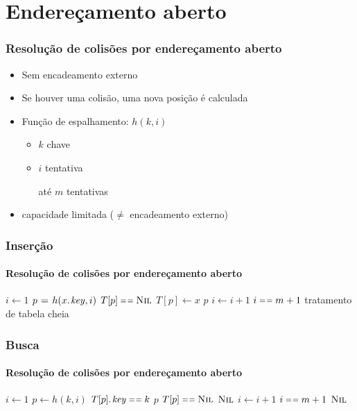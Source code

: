 \documentclass{beamer}
\begin{document}
\section{Endereçamento aberto}

\begin{frame}

\frametitle{Resolução de colisões por endereçamento aberto}

\begin{itemize}

  \item Sem encadeamento externo

  \item Se houver uma colisão, uma nova posição é calculada

  \item Função de espalhamento: $h(k, i)$

    \begin{itemize}

      \item $k$ chave

      \item $i$ \alert{tentativa}

      até $m$ tentativas

    \end{itemize}

  \item capacidade limitada ($\neq$ encadeamento externo)

\end{itemize}

\end{frame}

\begin{frame}

\frametitle{Inserção}
\framesubtitle{Resolução de colisões por endereçamento aberto}

\begin{codebox}
    \li $i \gets 1$
    \li \Repeat 
    \li   $p \gets h(\attrib{x}{key}, i)$ 
    \li   \If $T[p] \isequal \const{Nil}$
    \li   \Then $T[p] \gets x$
    \li     \Return $p$
    \li   \Else $i \gets i+1$
          \End
    \li \Until $i \isequal m+1$
    \li \Comment tratamento de tabela cheia
\end{codebox}

\end{frame}

\begin{frame}

\frametitle{Busca}
\framesubtitle{Resolução de colisões por endereçamento aberto}

\begin{codebox}
    \li $i \gets 1$
    \li \Repeat 
    \li   $p \gets h(k, i)$ 
    \li   \If $\attrib{T[p]}{key} \isequal k$
    \li   \Then \Return $p$
          \End
    \li   \If $T[p] \isequal \const{Nil}$
    \li   \Then \Return $\textnormal{\scshape Nil}$
          \End
    \li   $i \gets i+1$
          \End
    \li \Until $i \isequal m+1$
    \li \Return $\textnormal{\scshape Nil}$
\end{codebox}

\end{frame}
\end{document}
